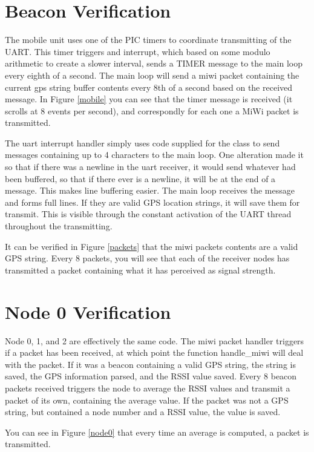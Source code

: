 \documentclass{article}
\begin{document}
\section*{Beacon Verification}
The mobile unit uses one of the PIC timers to coordinate transmitting of the
UART.  This timer triggers and interrupt, which based on some modulo arithmetic
to create a slower interval, sends a TIMER message to the main loop every eighth
of a second.  The main loop will send a miwi packet containing the current gps string buffer
contents every 8th of a second based on the received message.  In Figure \ref{mobile}
you can see that the timer message is received (it scrolls at 8 events per
second), and correspondly for each one a MiWi packet is transmitted.

The uart interrupt handler simply uses code supplied for the class to send
messages containing up to 4 characters to the main loop.  One alteration made it
so that if there was a newline in the uart receiver, it would send whatever had
been buffered, so that if there ever is a newline, it will be at the end of a
message.  This makes line buffering easier.  The main loop receives the message
and forms full lines.  If they are valid GPS location strings, it will save them
for transmit.  This is visible through the constant activation of the UART
thread throughout the transmitting.

It can be verified in Figure \ref{packets} that the miwi packets contents are a valid
GPS string.  Every 8 packets, you will see that each of the receiver nodes has
transmitted a packet containing what it has perceived as signal strength.

\section*{Node 0 Verification}
Node 0, 1, and 2 are effectively the same code.  The miwi packet handler
triggers if a packet has been received, at which point the function
handle\_miwi will deal with the packet.  If it was a beacon containing a valid
GPS string, the string is saved, the GPS information parsed, and the RSSI value
saved.  Every 8 beacon packets received triggers the node to average the RSSI
values and transmit a packet of its own, containing the average value.  If the
packet was not a GPS string, but contained a node number and a RSSI value, the
value is saved. 

You can see in Figure \ref{node0} that every time an average is computed, a packet is
transmitted.  
\end{document}
